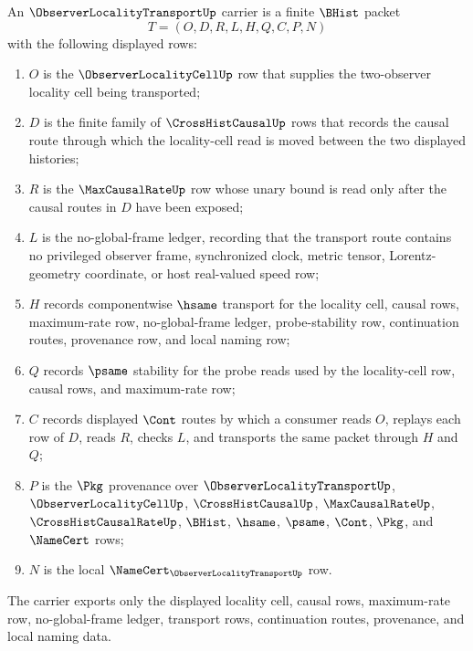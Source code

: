\begin{definition}
\label{def:observer-locality-transport-carrier}
An $\ObserverLocalityTransportUp$ carrier is a finite $\BHist$ packet
$$
T=(O,D,R,L,H,Q,C,P,N)
$$
with the following displayed rows:
\begin{enumerate}
\item $O$ is the $\ObserverLocalityCellUp$ row that supplies the two-observer locality cell being transported;
\item $D$ is the finite family of $\CrossHistCausalUp$ rows that records the causal route through which the locality-cell read is moved between the two displayed histories;
\item $R$ is the $\MaxCausalRateUp$ row whose unary bound is read only after the causal routes in $D$ have been exposed;
\item $L$ is the no-global-frame ledger, recording that the transport route contains no privileged observer frame, synchronized clock, metric tensor, Lorentz-geometry coordinate, or host real-valued speed row;
\item $H$ records componentwise $\hsame$ transport for the locality cell, causal rows, maximum-rate row, no-global-frame ledger, probe-stability row, continuation routes, provenance row, and local naming row;
\item $Q$ records $\psame$ stability for the probe reads used by the locality-cell row, causal rows, and maximum-rate row;
\item $C$ records displayed $\Cont$ routes by which a consumer reads $O$, replays each row of $D$, reads $R$, checks $L$, and transports the same packet through $H$ and $Q$;
\item $P$ is the $\Pkg$ provenance over $\ObserverLocalityTransportUp$, $\ObserverLocalityCellUp$, $\CrossHistCausalUp$, $\MaxCausalRateUp$, $\CrossHistCausalRateUp$, $\BHist$, $\hsame$, $\psame$, $\Cont$, $\Pkg$, and $\NameCert$ rows;
\item $N$ is the local $\NameCert_{\ObserverLocalityTransportUp}$ row.
\end{enumerate}
The carrier exports only the displayed locality cell, causal rows, maximum-rate row, no-global-frame ledger, transport rows, continuation routes, provenance, and local naming data.
\end{definition}


